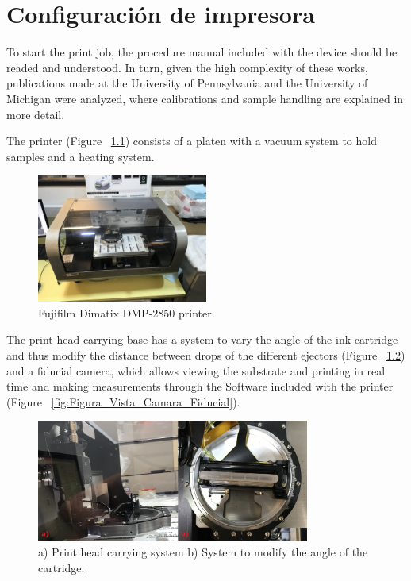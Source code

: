 \chapter{Configuración de impresora}\label{chap:apendiceA}
To start the print job, the procedure manual included with the device \cite{DimatixUM} should be readed and understood. In turn, given the high complexity of these works, publications made at the University of Pennsylvania \cite{UPenn} and the University of Michigan \cite{UMic} were analyzed, where calibrations and sample handling are explained in more detail.

The printer (Figure ~\ref{fig:Figura_Impresora_DMP2850}) consists of a platen with a vacuum system to hold samples and a heating system.

\begin{figure}[H]
  \centering
    \includegraphics[width=0.5\textwidth]{Figures/Figura_Impresora_DMP2850}
  \caption{Fujifilm Dimatix DMP-2850 printer.}
  \label{fig:Figura_Impresora_DMP2850}
\end{figure}

The print head carrying base has a system to vary the angle of the ink cartridge and thus modify the distance between drops of the different ejectors (Figure ~\ref{fig:Figura_Carriage_angulo}) and a fiducial camera, which allows viewing the substrate and printing in real time and making measurements through the Software included with the printer (Figure ~\ref{fig:Figura_Vista_Camara_Fiducial}). 

\begin{figure}[H]
  \centering
    \includegraphics[width=0.8\textwidth]{Figures/Figura_Carriage_angulo}
  \caption{a) Print head carrying system b) System to modify the angle of the cartridge.}
  \label{fig:Figura_Carriage_angulo}
\end{figure}

